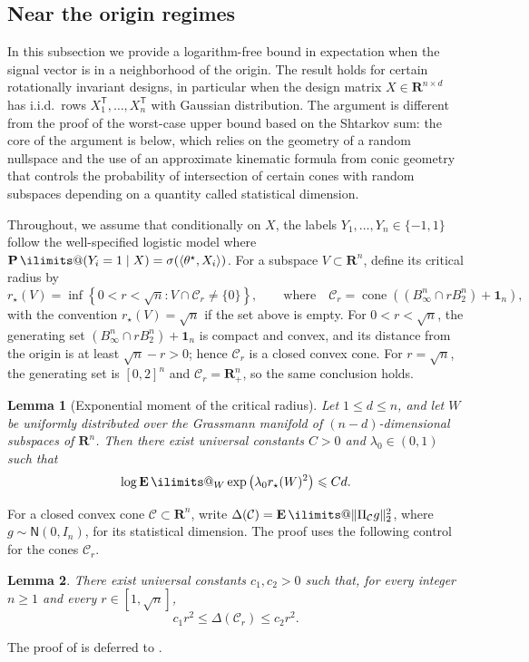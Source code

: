\documentclass[11pt, letterpaper, hidelinks]{article}
\makeatletter
\newcommand{\R}{\mathbf R}
\newcommand{\1}{\mathbf 1}
\renewcommand{\le}{\leqslant}
\renewcommand{\leq}{\leqslant}
\renewcommand{\geq}{\geqslant}
\newcommand{\T}{\mathsf{T}}
\newcommand{\iid}{\textnormal{i.i.d.}}
\newcommand{\E}{\operatorname*{\mathbf{E}}\ilimits@}
\renewcommand{\P}{\operatorname*{\mathbf{P}}\ilimits@}
\theoremstyle{plain}
\newtheorem{lemma}{Lemma}[section]
\theoremstyle{definition}
\newcommand{\thetastar}{\theta^\star}
\let\top\T
\newcommand{\Normal}[2]{\mathsf{N}\left(#1, #2\right)}
\newcommand{\defn}{=}
\makeatother
\begin{document}
\subsection{Near the origin regimes}
\label{sec:near-origin-regime}

In this subsection we provide a logarithm-free bound in expectation when the signal vector is in a
neighborhood of the origin. The result holds for certain rotationally invariant designs, in particular when the design matrix $X\in \R^{n\times d}$ has \iid\ rows $X_1^\top, \dots, X_n^\top$ with Gaussian distribution. The argument is different from the proof of the worst-case upper bound based on the Shtarkov sum: the core of the argument is  below, which relies on the geometry of a random nullspace and the use of an approximate kinematic formula from conic geometry~\cite{amelunxen2014living} that controls the probability of intersection of certain cones with random subspaces depending on a quantity called statistical dimension.

Throughout, we assume that conditionally on $X$, the labels $Y_1,\dots,Y_n\in\{-1,1\}$ follow the well-specified logistic model where $\P(Y_i=1\mid X)=\sigma(\langle \thetastar, X_i \rangle)$. For a subspace \(V\subset\R^n\), define its critical radius by
\begin{equation}
\label{eq:crit-radius-and-cones}
r_\star(V) \defn \inf\left\{ 0<r<\sqrt n: V\cap \mathcal C_r\neq\{0\} \right\},
\qquad\text{where}\quad
\mathcal C_r
\defn
\operatorname{cone}\left((B_\infty^n\cap rB_2^n)+\1_n\right),
\end{equation}
with the convention \(r_\star(V)=\sqrt n\) if the set above is empty.
For $0<r<\sqrt n$, the generating set $(B_\infty^n\cap rB_2^n)+\1_n$ is compact and convex, and its distance from the origin is at least $\sqrt n-r>0$; hence $\mathcal C_r$ is a closed convex cone. For $r=\sqrt n$, the generating set is $[0,2]^n$ and $\mathcal C_r=\R_+^n$, so the same conclusion holds.

\begin{lemma}[Exponential moment of the critical radius]
\label{lem:critical-radius-mgf-bound}
Let \(1\le d\le n\), and let \(W\) be uniformly distributed over the
Grassmann manifold of \((n-d)\)-dimensional subspaces of \(\R^n\). Then there
exist universal constants \(C>0\) and \(\lambda_0\in(0,1)\) such that
\[
\log \E_W \exp\left(\lambda_0 r_\star(W)^2\right)
\leq C d .
\]
\end{lemma}

For a closed convex cone $\mathcal C\subset\R^n$, write
$\Delta(\mathcal C)\defn\E\|\Pi_{\mathcal C}g\|_2^2$, where
$g\sim\Normal{0}{I_n}$, for its statistical dimension. The proof uses the
following control for the cones $\mathcal C_r$.
\begin{lemma}
\label{lem:quadratic-stat-dim}
There exist universal constants \(c_1,c_2 > 0\) such that, for every integer
\(n\geq 1\) and every $r \in [1,\sqrt n]$,
\[
c_1 r^2 \leq \Delta(\mathcal C_r) \leq c_2 r^2.
\]
\end{lemma}
The proof of  is deferred to
.
\end{document}

